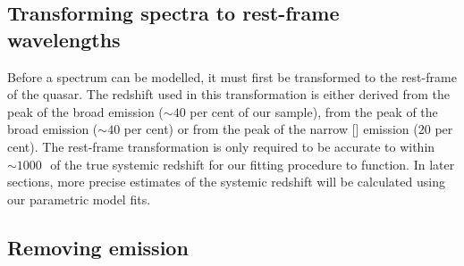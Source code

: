 \subsection{Transforming spectra to rest-frame wavelengths}

Before a spectrum can be modelled, it must first be transformed to the rest-frame of the quasar.  
The redshift used in this transformation is either derived from the peak of the broad \ha emission ($\sim40$ per cent of our sample), from the peak of the broad \hb emission ($\sim40$ per cent) or from the peak of the narrow [] emission ($20$ per cent).
The rest-frame transformation is only required to be accurate to within $\sim1000$\,\kms\, of the true systemic redshift for our fitting procedure to function. 
In later sections, more precise estimates of the systemic redshift will be calculated using our parametric model fits. 

\subsection{Removing  emission}
\label{sec:ch4-fe-removal}

